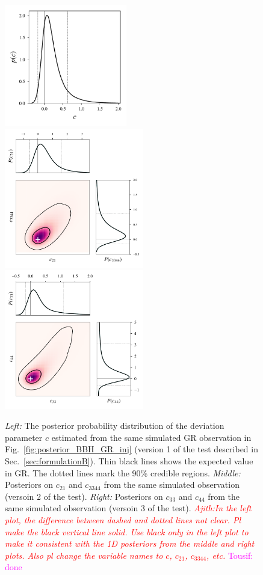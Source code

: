 \documentclass[prd,preprintnumbers,twocolumn,eqsecnum,floatfix,a4paper,nofootinbib,superscriptaddress]{revtex4}
\newcommand{\ajith}[1]{\textcolor{red}{\textit{Ajith:#1}}}
\newcommand{\tousif}[1]{\textcolor{magenta}{Tousif: #1}}
\begin{document}
\begin{figure}[tbh]
	\begin{center}
 		\includegraphics[height=2.1in]{figs/hist_c1_M_80_q_9_SNR_25.pdf}
		\includegraphics[height=2.4in]{figs/c2_c34_M_80_q_9_SNR_25.pdf}
		\includegraphics[height=2.4in]{figs/c3_c4_M_80_q_9_SNR_25.pdf}
	\end{center} 
 	\caption{\emph{Left:} The posterior probability distribution of the deviation parameter $c$ estimated from the same simulated GR observation in Fig.~\ref{fig:posterior_BBH_GR_inj} (version 1 of the test described in Sec.~\ref{sec:formulationB}). Thin black lines shows the expected value in GR. The dotted lines mark the 90\% credible regions. \emph{Middle:} Posteriors on $c_{21}$ and $c_{3344}$ from the same simulated observation (versoin 2 of the test). \emph{Right:} Posteriors on $c_{33}$ and $c_{44}$ from the same simulated observation (versoin 3 of the test). \ajith{In the left plot, the difference between dashed and dotted lines not clear. Pl make the black vertical line solid. Use black only in the left plot to make it consistent with the 1D posteriors from the middle and right plots. Also pl change the variable names to $c$, $c_{21}$, $c_{3344}$, etc.} \tousif{done}}
	\label{fig:test2posts}
\end{figure}
\end{document}
